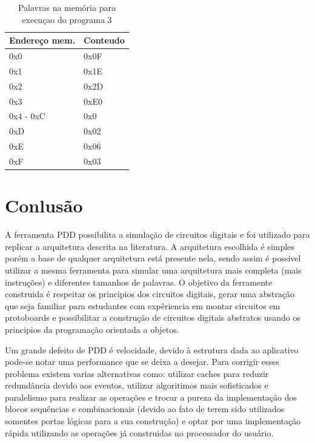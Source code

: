 \documentclass[11pt, twocolumn]{article}
\begin{document}
\begin{table}
  \caption{Palavras na memória para execuçao do programa 3}
\begin{tabular}{ll}
  \hline
  Endereço mem. & Conteudo \\
  \hline
  0x0 & 0x0F \\
  0x1 & 0x1E \\
  0x2 & 0x2D \\
  0x3 & 0xE0 \\
  0x4 - 0xC & 0x0 \\
  0xD & 0x02 \\
  0xE & 0x06 \\
  0xF & 0x03 \\
  \hline
  \end{tabular}
\end{table}
\label{tab-p3}


\section{Conlusão}

A ferramenta PDD possibilita a simulação de circuitos digitais e foi utilizado para replicar a arquitetura descrita na literatura. A arquitetura escolhida é simples porém a base de qualquer arquitetura está presente nela, sendo assim é possivel utilizar a mesma ferramenta para simular uma arquitetura mais completa (mais instruções) e diferentes tamanhos de palavras. O objetivo da ferramente construida é respeitar os principios dos circuitos digitais, gerar uma abstração que seja familiar para estudantes com expêriencia em montar circuitos em protoboards e possibilitar a construção de circuitos digitais abstratos usando os principios da programação orientada a objetos.

Um grande defeito de PDD é velocidade, devido à estrutura dada ao aplicativo pode-se notar uma performance que se deixa a desejar. Para corrigir esses problema existem varias alternativas como: utilizar caches para reduzir redundância devido aos eventos, utilizar algoritimos mais sofisticados e paralelismo para realizar as operações e trocar a pureza da implementação dos blocos sequências e combinacionais (devido ao fato de terem sido utilizados somentes portas lógicas para a sua construção) e optar por uma implementação rápida utilizando as operações já construidas no processador do usuário.
\end{document}
